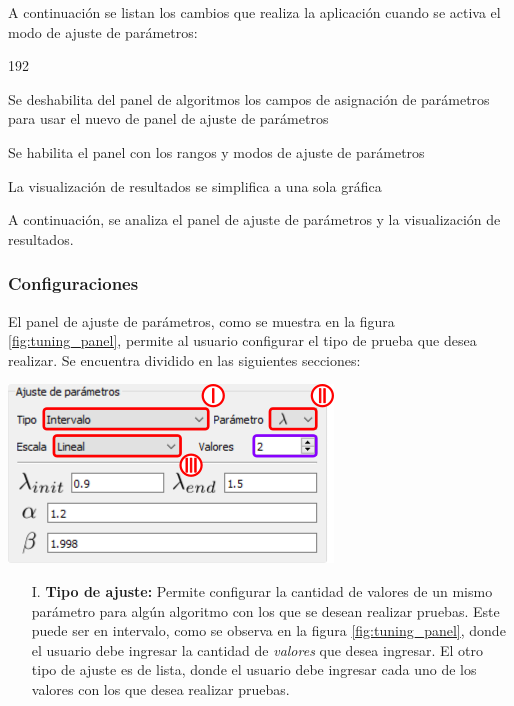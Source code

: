 \documentclass[12pt,twoside,letter]{ol-softwaremanual}
\newenvironment{Figure}
  {\par\medskip\noindent\minipage{\linewidth}}
  {\endminipage\par\medskip}
\begin{document}
A continuación se listan los cambios que realiza la aplicación cuando se activa el modo de ajuste de parámetros:

\begin{dingautolist}{192}
	\setlength\itemsep{0em}
	\item Se deshabilita del panel de algoritmos los campos de asignación de parámetros para usar el nuevo de panel de ajuste de parámetros
	\item Se habilita el panel con los rangos y modos de ajuste de parámetros
	\item La visualización de resultados se simplifica a una sola gráfica
\end{dingautolist}

A continuación, se analiza el panel de ajuste de parámetros y la visualización de resultados.

\subsubsection{Configuraciones}

El panel de ajuste de parámetros, como se muestra en la figura \ref{fig:tuning_panel}, permite al usuario configurar el tipo de prueba que desea realizar. Se encuentra dividido en las siguientes secciones:

\begin{multicols}{2}
	
\begin{Figure}
	\centering
	\includegraphics[width=0.9\linewidth]{tuning-panel.png}
	\label{fig:tuning_panel}
\end{Figure}	

\begin{itemize}
	
    \item[I.] \textbf{Tipo de ajuste:} Permite configurar la cantidad de valores de un mismo parámetro para algún algoritmo con los que se desean realizar pruebas. Este puede ser en intervalo, como se observa en la figura \ref{fig:tuning_panel}, donde el usuario debe ingresar la cantidad de \textcolor{ClearPurple}{\emph{valores}} que desea ingresar. El otro tipo de ajuste es de lista, donde el usuario debe ingresar cada uno de los valores con los que desea realizar pruebas.    
    
\end{itemize}

\end{multicols}
\end{document}
